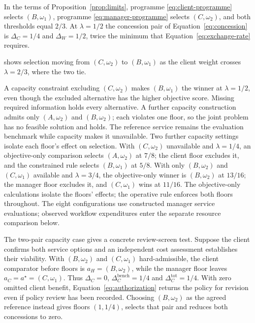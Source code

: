 \documentclass[oneside,10pt,english]{swissi}
\begin{document}
In the terms of Proposition~\ref{prop:limits}, programme \eqref{eq:client-programme} selects $(B,\omega_1)$, programme \eqref{eq:manager-programme} selects $(C,\omega_2)$, and both thresholds equal $2/3$. At $\lambda=1/2$ the concession pair of Equation~\eqref{eq:concession} is $\Delta_C=1/4$ and $\Delta_W=1/2$, twice the minimum that Equation~\eqref{eq:exchange-rate} requires.

 shows selection moving from $(C,\omega_2)$ to $(B,\omega_1)$ as the client weight crosses $\lambda=2/3$, where the two tie.



A capacity constraint excluding $(C,\omega_2)$ makes $(B,\omega_1)$ the winner at $\lambda=1/2$, even though the excluded alternative has the higher objective score. Missing required information holds every alternative. A further capacity construction admits only $(A,\omega_2)$ and $(B,\omega_2)$; each violates one floor, so the joint problem has no feasible solution and holds. The reference service remains the evaluation benchmark while capacity makes it unavailable. Two further capacity settings isolate each floor's effect on selection. With $(C,\omega_2)$ unavailable and $\lambda=1/4$, an objective-only comparison selects $(A,\omega_2)$ at $7/8$; the client floor excludes it, and the constrained rule selects $(B,\omega_1)$ at $5/8$. With only $(B,\omega_2)$ and $(C,\omega_1)$ available and $\lambda=3/4$, the objective-only winner is $(B,\omega_2)$ at $13/16$; the manager floor excludes it, and $(C,\omega_1)$ wins at $11/16$. The objective-only calculations isolate the floors' effects; the operative rule enforces both floors throughout. The eight configurations use constructed manager service evaluations; observed workflow expenditures enter the separate resource comparison below.

The two-pair capacity case gives a concrete review-screen test. Suppose the client confirms both service options and an independent cost assessment establishes their viability. With $(B,\omega_2)$ and $(C,\omega_1)$ hard-admissible, the client comparator before floors is $a_H=(B,\omega_2)$, while the manager floor leaves $a_C=a^\star=(C,\omega_1)$. Thus $\Delta_C=0$, $\Delta_C^{\mathrm{bench}}=1/4$ and $\Delta_C^{\mathrm{tot}}=1/4$. With zero omitted client benefit, Equation~\eqref{eq:authorization} returns the policy for revision even if policy review has been recorded. Choosing $(B,\omega_2)$ as the agreed reference instead gives floors $(1,1/4)$, selects that pair and reduces both concessions to zero.
\end{document}
